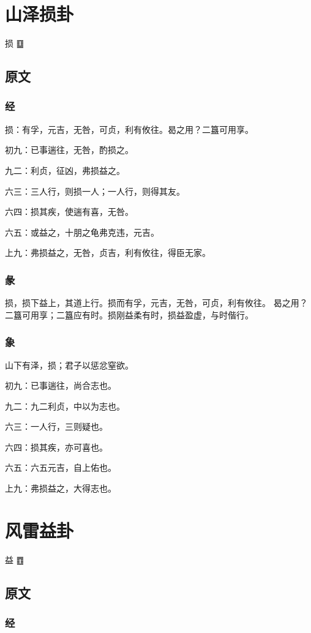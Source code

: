 \documentclass[12pt,oneside]{book}
\begin{document}
\chapter{山泽损卦}
损 {\Large ䷨}
\section{原文}

\subsection{经}
损：有孚，元吉，无咎，可贞，利有攸往。曷之用？二簋可用享。

初九：已事遄往，无咎，酌损之。

九二：利贞，征凶，弗损益之。

六三：三人行，则损一人；一人行，则得其友。

六四：损其疾，使遄有喜，无咎。

六五：或益之，十朋之龟弗克违，元吉。

上九：弗损益之，无咎，贞吉，利有攸往，得臣无家。

\subsection{彖}
损，损下益上，其道上行。损而有孚，元吉，无咎，可贞，利有攸往。 曷之用？ 二簋可用享；二簋应有时。损刚益柔有时，损益盈虚，与时偕行。

\subsection{象}
山下有泽，损；君子以惩忿窒欲。

初九：已事遄往，尚合志也。

九二：九二利贞，中以为志也。

六三：一人行，三则疑也。

六四：损其疾，亦可喜也。

六五：六五元吉，自上佑也。

上九：弗损益之，大得志也。


\chapter{风雷益卦}
益 {\Large ䷩}
\section{原文}

\subsection{经}
\end{document}
